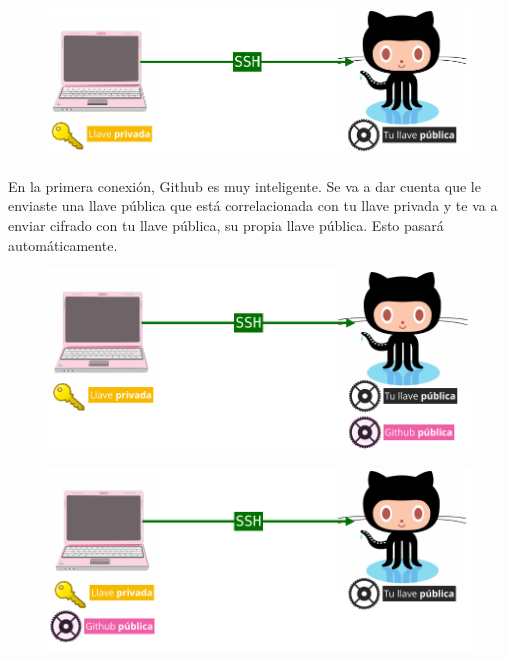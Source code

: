 \documentclass{article}
\begin{document}
\begin{figure}[h!]
  \centering
  \includegraphics[scale=0.5]{./Pictures/215_push_ssh.png}
\end{figure}

\newpage

En la primera conexión, Github es muy inteligente. Se va a dar cuenta que le
enviaste una llave pública que está correlacionada con tu llave privada y te va
a enviar cifrado con tu llave pública, su propia llave pública. Esto pasará
automáticamente.

\begin{figure}[h!]
  \centering
  \includegraphics[scale=0.5]{./Pictures/216_github_public.png}
\end{figure}

\begin{figure}[h!]
  \centering
  \includegraphics[scale=0.5]{./Pictures/217_github_public_me.png}
\end{figure}
\end{document}
